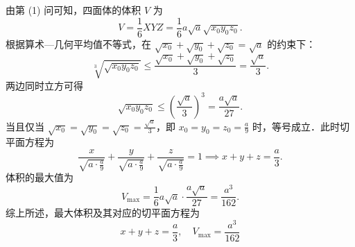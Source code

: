 \begin{solution}
    由第 (1) 问可知，四面体的体积 $V$ 为
    \begin{equation}
        V = \frac{1}{6} XYZ = \frac{1}{6} a\sqrt{a} \sqrt{x_0 y_0 z_0}.
    \end{equation}
    根据算术—几何平均值不等式，在 $\sqrt{x_0} + \sqrt{y_0} + \sqrt{z_0} = \sqrt{a}$ 的约束下：
    \begin{equation}
        \sqrt[3]{\sqrt{x_0 y_0 z_0}} \le \frac{\sqrt{x_0} + \sqrt{y_0} + \sqrt{z_0}}{3} = \frac{\sqrt{a}}{3}.
    \end{equation}
    两边同时立方可得
    \begin{equation}
        \sqrt{x_0 y_0 z_0} \le \left( \frac{\sqrt{a}}{3} \right)^3 = \frac{a\sqrt{a}}{27}.
    \end{equation}
    当且仅当 $\sqrt{x_0} = \sqrt{y_0} = \sqrt{z_0} = \frac{\sqrt{a}}{3}$，即 $x_0 = y_0 = z_0 = \frac{a}{9}$ 时，等号成立．此时切平面方程为
    \begin{equation}
        \frac{x}{\sqrt{a \cdot \frac{a}{9}}} + \frac{y}{\sqrt{a \cdot \frac{a}{9}}} + \frac{z}{\sqrt{a \cdot \frac{a}{9}}} = 1 \implies x + y + z = \frac{a}{3}.
    \end{equation}
    体积的最大值为
    \begin{equation}
        V_{\max} = \frac{1}{6} a\sqrt{a} \cdot \frac{a\sqrt{a}}{27} = \frac{a^3}{162}.
    \end{equation}
    综上所述，最大体积及其对应的切平面方程为
    \begin{equation}
        \boxed{x + y + z = \frac{a}{3}, \quad V_{\max} = \frac{a^3}{162}}
    \end{equation}
\end{solution}

\endinput
